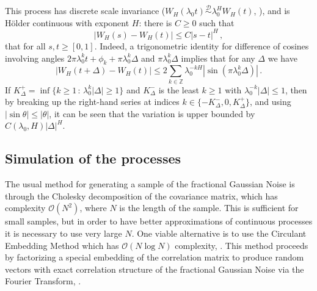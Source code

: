 \documentclass[a4paper]{article}
\newcommand{\Dcal}{\mathcal{D}}
\begin{document}
This process has discrete scale invariance ($W_H(\lambda_0 t) \overset{\Dcal}{\sim} \lambda_0^H W_H(t)$,
\cite{decrouez2015}), and is H\"older continuous with exponent $H$: there is $C \geq 0$
such that
\begin{equation} \label{eq:def_holder}
    \bigl| W_H(s) - W_H(t) \bigr| \leq C |s - t|^H \,,
\end{equation}
that for all $s,t\geq [0,1]$. Indeed, a trigonometric identity for difference of
cosines involving angles $2\pi \lambda_0^k t + \phi_k + \pi \lambda_0^k \Delta$
and $\pi \lambda_0^k \Delta$ implies that for any $\Delta$ we have
\begin{equation*}
    \bigl| W_H(t+\Delta) - W_H(t) \bigr|
        \leq 2 \sum_{k\in \mathbb{Z}} \lambda_0^{-k H} |\sin(\pi \lambda_0^k \Delta)| \,.
\end{equation*}
If $K^+_\Delta = \inf\{k\geq 1\,:\, \lambda_0^k |\Delta| \geq 1\}$ and $K^-_\Delta$
is the least $k\geq 1$ with $\lambda_0^{-k} |\Delta| \leq 1$, then by breaking up
the right-hand series at indices $k\in\{-K^-_\Delta, 0, K^+_\Delta\}$, and using
$|\sin \theta| \leq |\theta|$, it can be seen that the variation is upper bounded
by $C(\lambda_0, H) |\Delta|^H$.


\subsection{Simulation of the processes} %
\label{sub:simulation_of_the_processes}

The usual method for generating a sample of the fractional Gaussian Noise is through
the Cholesky decomposition of the covariance matrix, which has complexity $\mathcal{O}(N^2)$,
where $N$ is the length of the sample. This is sufficient for small samples, but
in order to have better approximations of continuous processes it is necessary to
use very large $N$. One viable alternative is to use the Circulant Embedding Method
which has $\mathcal{O}(N \log N)$ complexity, \cite{WRCR:WRCR6232}. This method
proceeds by factorizing a special embedding of the correlation matrix to produce
random vectors with exact correlation structure of the fractional Gaussian Noise
via the Fourier Transform, \cite{Perrin:1058211}.
\end{document}
